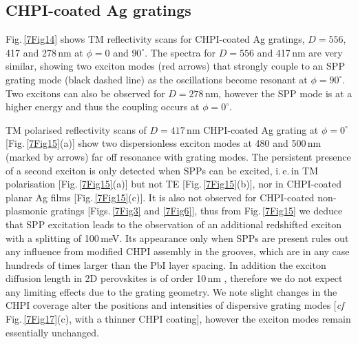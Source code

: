 \subsection{CHPI-coated Ag gratings}
Fig.\,\ref{7Fig14} shows TM reflectivity scans for CHPI-coated Ag gratings, $D=556$, 417 and 278\,nm at $\phi=0$ and $90^{\circ}$. The spectra for $D=556$ and 417\,nm are very similar, showing two exciton modes (red arrows) that strongly couple to an SPP grating mode (black dashed line) as the oscillations become resonant at $\phi=90^{\circ}$. Two excitons can also be observed for $D=278$\,nm, however the SPP mode is at a higher energy and thus the coupling occurs at $\phi=0^{\circ}$.

TM polarised reflectivity scans of $D=417$\,nm CHPI-coated Ag grating at $\phi=0^{\circ}$ [Fig.\,\ref{7Fig15}(a)] show two dispersionless exciton modes at 480 and 500\,nm (marked by arrows) far off resonance with grating modes. The persistent presence of a second exciton is only detected when SPPs can be excited, i.\,e.\,in TM polarisation [Fig.\,\ref{7Fig15}(a)] but not TE [Fig.\,\ref{7Fig15}(b)], nor in CHPI-coated planar Ag films [Fig.\,\ref{7Fig15}(c)]. It is also not observed for CHPI-coated non-plasmonic gratings [Figs.\,\ref{7Fig3} and \ref{7Fig6}], thus from Fig.\,\ref{7Fig15} we deduce that SPP excitation leads to the observation of an additional redshifted exciton with a splitting of 100\,meV. Its appearance only when SPPs are present rules out any influence from modified CHPI assembly in the grooves, which are in any case hundreds of times larger than the PbI layer spacing. In addition the exciton diffusion length in 2D perovskites is of order 10\,nm \cite{Ahmad2013}, therefore we do not expect any limiting effects due to the grating geometry. We note slight changes in the CHPI coverage alter the positions and intensities of dispersive grating modes [\textit{cf} Fig.\,\ref{7Fig17}(c), with a thinner CHPI coating], however the exciton modes remain essentially unchanged.

